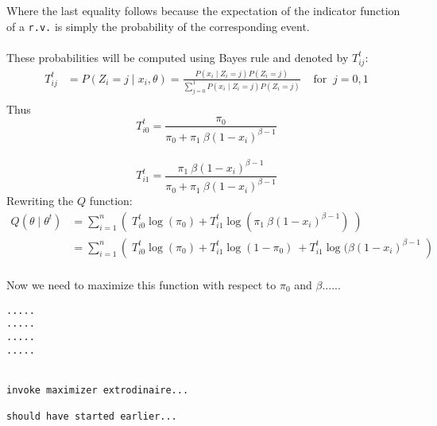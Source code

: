 \documentclass[12pt]{article}
\begin{document}
\begin{enumerate}[(a)]
  Where the last equality follows because the expectation of the indicator function of a \texttt{r.v.} is simply the probability of the corresponding event. \\
  \\
  These probabilities will be computed using Bayes rule and denoted by $T_{ij}^t$:
\begin{align*}  
T_{ij}^t &= P(Z_i = j \mid x_i, \theta) = \frac{P( x_i \mid Z_i = j) P(Z_i = j) } {\sum_{j=0}^1  P( x_i \mid Z_i = j) P(Z_i = j) }  \; \; \; \; \text{for} \; \; j = 0, 1 \\
\end{align*} 
Thus
$$
T_{i0}^t = \frac{\pi_0}{\pi_0 + \pi_1 \ \beta (1 - x_i)^{\beta - 1}} 
$$
\\
$$
T_{i1}^t = \frac{\pi_1 \ \beta (1 - x_i)^{\beta - 1}} { \pi_0 + \pi_1 \ \beta (1 - x_i)^{\beta - 1} }
$$
Rewriting the $Q$ function:
\begin{align*}
Q(\theta \mid \theta^t) &= \sum_{i=1}^n \left( \;  T_{i0}^t \log(\pi_0) + T_{i1}^t \log(\pi_1\ \beta (1 - x_i)^{\beta - 1}) \; \right) \\
&= \sum_{i=1}^n \left(\;  T_{i0}^t \log(\pi_0) + T_{i1}^t \log(1 - \pi_0) \ + T_{i1}^t \log (\beta (1 - x_i)^{\beta - 1} \;  \right) \\
\end{align*}

Now we need to maximize this function with respect to $\pi_0$ and $\beta$......

\begin{verbatim}
.....
.....
.....
.....


invoke maximizer extrodinaire...

should have started earlier...
\end{verbatim}


\end{enumerate}

\vspace{1000 mm}









\begin{verbatim}






























\end{verbatim}
\end{document}
